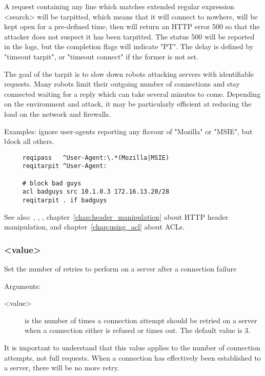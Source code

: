   A request containing any line which matches extended regular expression
  <search> will be tarpitted, which means that it will connect to nowhere, will
  be kept open for a pre-defined time, then will return an HTTP error 500 so
  that the attacker does not suspect it has been tarpitted. The status 500 will
  be reported in the logs, but the completion flags will indicate "PT". The
  delay is defined by "timeout tarpit", or "timeout connect" if the former is
  not set.

  The goal of the tarpit is to slow down robots attacking servers with
  identifiable requests. Many robots limit their outgoing number of connections
  and stay connected waiting for a reply which can take several minutes to
  come. Depending on the environment and attack, it may be particularly
  efficient at reducing the load on the network and firewalls.

  Examples: ignore user-agents reporting any flavour of "Mozilla" or "MSIE", but block all others.
  \begin{verbatim}
     reqipass   ^User-Agent:\.*(Mozilla|MSIE)
     reqitarpit ^User-Agent:

     # block bad guys
     acl badguys src 10.1.0.3 172.16.13.20/28
     reqitarpit . if badguys
  \end{verbatim}


See also: , , , chapter~\ref{chap:header_manipulation} about HTTP header
            manipulation, and chapter~\ref{chap:using_acl} about ACLs.

\subsubsection[retries]{ <value>}

  Set the number of retries to perform on a server after a connection failure


  Arguments:
  \begin{description}
  \item[<value>] is the number of times a connection attempt should be retried on
              a server when a connection either is refused or times out. The
              default value is 3.
  \end{description}
  
  It is important to understand that this value applies to the number of
  connection attempts, not full requests. When a connection has effectively
  been established to a server, there will be no more retry.

